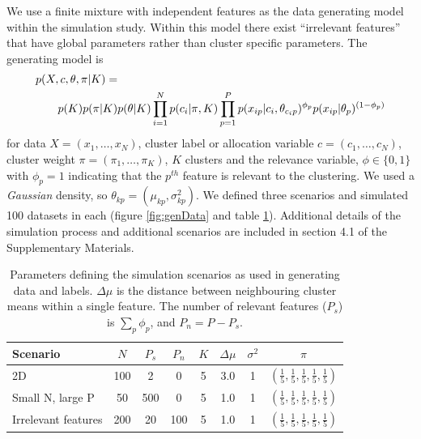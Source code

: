\documentclass{bmcart}
\begin{document}
	We use a finite mixture with independent features as the data generating model within the simulation study. Within this model there exist ``irrelevant features'' \citep{law2003feature} that have global parameters rather than cluster specific parameters. The generating model is
	\begin{align} 
		p(X, c, \theta, \pi| K) =& \notag\\
		p(K) p(\pi|K) &p(\theta|K) \prod_{i=1}^N p (c_i | \pi, K)  \prod_{p=1}^P p(x_{ip} | c_i, \theta_{c_ip})^ {\phi_p} p(x_{ip} | \theta_p) ^ {(1 - \phi_p)}\label{eqn:simGenModel}
	\end{align}
	for data $X=(x_1, \ldots, x_N)$, cluster label or allocation variable $c=(c_1, \ldots, c_N)$, cluster weight $\pi=(\pi_1, \ldots, \pi_K)$, $K$ clusters and the relevance variable, $\phi \in \{0, 1\}$ with $\phi_p=1$ indicating that the $p^{th}$ feature is relevant to the clustering. We used a \emph{Gaussian} density, so $\theta_{kp} = (\mu_{kp}, \sigma^2_{kp})$. We defined three scenarios and simulated 100 datasets in each (figure \ref{fig:genData} and table \ref{table:scenarioTable}). Additional details of the simulation process and additional scenarios are included in section 4.1 of the Supplementary Materials.
		
	\begin{table}[ht!]
		\centering
		\caption{Parameters defining the simulation scenarios as used in generating data and labels. $\Delta \mu$ is the distance between neighbouring cluster means within a single feature.
			The number of relevant features (\(P_s\)) is $\sum_p \phi_p$, and $P_n = P - P_s$.}
		\begin{tabular}{l|ccccccc}
			\toprule
			\textbf{Scenario} & $N$ & $P_s$ & $P_n$ & $K$ & $\Delta \mu$ & $\sigma^2$ & $\pi$\\
			\midrule
			2D & 100 & 2 & 0 & 5 & 3.0 & 1 &  $(\frac{1}{5} , \frac{1}{5}, \frac{1}{5}, \frac{1}{5}, \frac{1}{5})$ \\
			Small N, large P & 50 & 500 & 0 & 5 & 1.0 & 1 &  $(\frac{1}{5} , \frac{1}{5}, \frac{1}{5}, \frac{1}{5}, \frac{1}{5})$\\
			Irrelevant features & 200 & 20 & 100 & 5 & 1.0 & 1 &  $(\frac{1}{5} , \frac{1}{5}, \frac{1}{5}, \frac{1}{5}, \frac{1}{5})$\\
			\hline
		\end{tabular}
		\label{table:scenarioTable}
	\end{table}%
	
\end{document}
